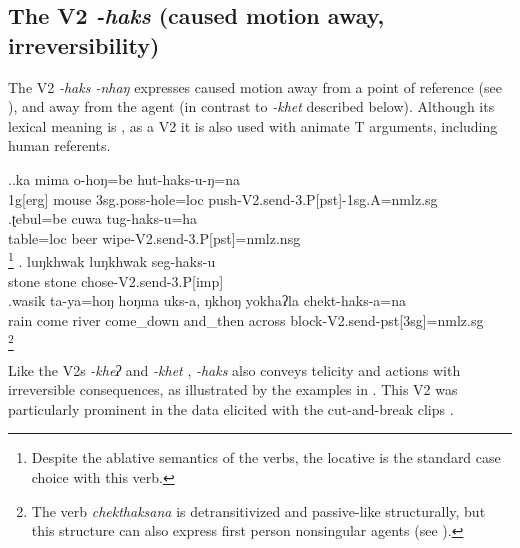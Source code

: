 \subsection{The V2 \emph{-haks} (caused motion away, irreversibility)}\label{V2-send}%

The V2 \emph{-haks \ti -nhaŋ}  expresses caused motion away from a point of reference (see \Next),  and away from the agent (in contrast to \emph{-khet}  described below).  Although its lexical meaning is , as a V2 it is also used with animate T arguments, including human referents.


\ex.\ag.ka mima o-hoŋ=be hut-haks-u-ŋ=na\\
{\sc 1g[erg]} mouse  {\sc 3sg.poss-}hole{\sc =loc} push{\sc -V2.send-3.P[pst]-1sg.A=nmlz.sg}\\
\bg.ʈebul=be cuwa tug-haks-u=ha\\
table{\sc =loc} beer wipe{\sc -V2.send-3.P[pst]=nmlz.nsg}\\
\footnote{Despite the ablative semantics of the verbs, the locative is the standard case choice with this verb.}
\bg. luŋkhwak luŋkhwak seg-haks-u\\
stone stone chose{\sc -V2.send-3.P[imp]}\\
\bg.wasik ta-ya=hoŋ hoŋma uks-a, ŋkhoŋ yokhaʔla chekt-haks-a=na\\
rain  come river come\_down and\_then across block{\sc -V2.send-pst[3sg]=nmlz.sg}\\
\footnote{The verb \emph{chekthaksana} is detransitivized and passive-like structurally, but this structure can also express first person nonsingular agents (see ).}


Like the V2s \emph{-kheʔ}  and \emph{-khet} , \emph{-haks}  also conveys telicity and actions with irreversible consequences, as illustrated by the examples in \Next. This V2 was  particularly prominent in the data elicited with the cut-and-break clips   \citep{Bohnemeyeretal2010_cut}.

